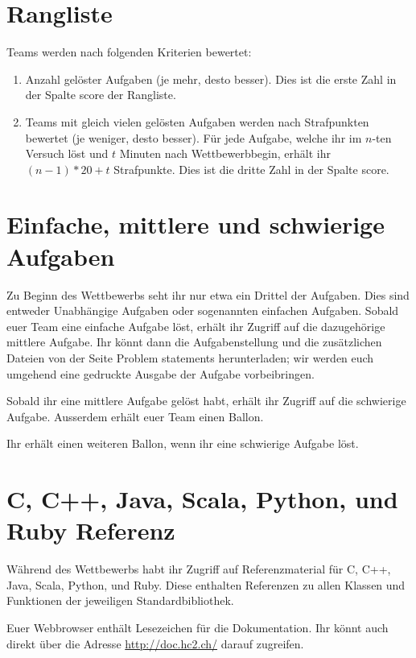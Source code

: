 \section{Rangliste}
Teams werden nach folgenden Kriterien bewertet:
\begin{enumerate}
    \item Anzahl gelöster Aufgaben (je mehr, desto besser). Dies ist die erste
        Zahl in der Spalte \glqq score\grqq{} der Rangliste.
    \item Teams mit gleich vielen gelösten Aufgaben werden nach Strafpunkten
        bewertet (je weniger, desto besser). Für jede Aufgabe, welche ihr im
        $n$-ten Versuch löst und $t$ Minuten nach Wettbewerbbegin, erhält ihr $(n-1)*20+t$ Strafpunkte. Dies ist die dritte
        Zahl in der Spalte \glqq score\grqq{}.
\end{enumerate}

\section{Einfache, mittlere und schwierige Aufgaben}
Zu Beginn des Wettbewerbs seht ihr nur etwa ein Drittel der Aufgaben.
Dies sind entweder Unabhängige Aufgaben oder
sogenannten \glqq einfachen\grqq{} Aufgaben. Sobald euer Team eine \glqq
einfache\grqq{} Aufgabe löst, erhält ihr Zugriff auf die dazugehörige \glqq
mittlere\grqq{} Aufgabe. Ihr könnt dann die Aufgabenstellung und die
zusätzlichen Dateien von der Seite \glqq Problem statements\grqq{}
herunterladen; wir werden euch umgehend eine gedruckte Ausgabe der Aufgabe
vorbeibringen.

Sobald ihr eine \glqq mittlere\grqq{} Aufgabe gelöst habt, erhält ihr Zugriff
auf die \glqq schwierige\grqq{} Aufgabe. Ausserdem erhält euer Team einen
Ballon.

Ihr erhält einen weiteren Ballon, wenn ihr eine \glqq schwierige\grqq{} Aufgabe
löst.

\section{C, C++, Java, Scala, Python, und Ruby Referenz}
Während des Wettbewerbs habt ihr Zugriff auf Referenzmaterial für C, C++,
Java, Scala, Python, und Ruby.
Diese enthalten Referenzen zu allen Klassen und Funktionen der jeweiligen
Standardbibliothek.

Euer Webbrowser enthält Lesezeichen für die Dokumentation. Ihr könnt auch direkt
über die Adresse \url{http://doc.hc2.ch/} darauf zugreifen.

